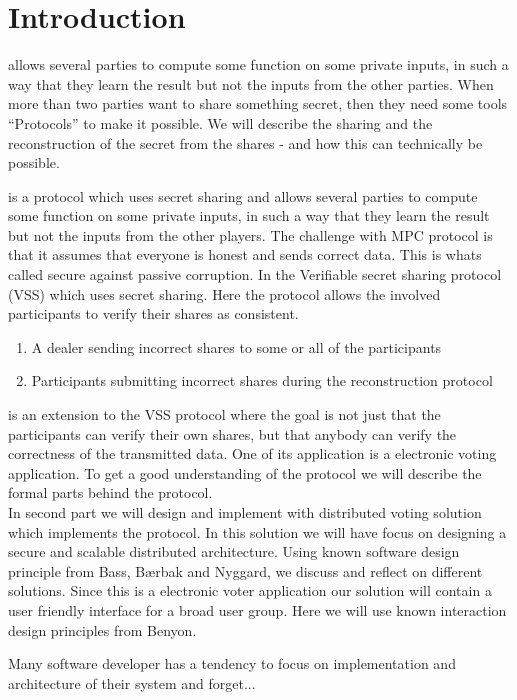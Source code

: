 \section{Introduction}

 allows several parties to compute some function on some private inputs, in such a way that they learn the result but not the inputs from the other parties. When more than two parties want to share something secret, then they need some tools “Protocols” to make it possible. We will describe the sharing and the reconstruction of the secret from the shares - and how this can technically be possible. 

 is a protocol which uses secret sharing and allows several parties to compute some function on some private inputs, in such a way that they learn the result but not the inputs from the other players.  The challenge with MPC protocol is that it assumes that everyone is honest and sends correct data. This is whats called secure against passive corruption. In the Verifiable secret sharing protocol (VSS) which uses secret sharing. Here the protocol allows the involved participants to verify their shares as consistent.   \\


\begin{infobox}
\begin{enumerate}
\item A dealer sending incorrect shares to some or all of the participants
\item Participants submitting incorrect shares during the reconstruction protocol
\end{enumerate}
\end{infobox}

 is an extension to the VSS protocol where the goal is not just that the participants can verify their own shares, but that anybody can verify the correctness of the transmitted data. One of its application is a electronic voting application. To get a good understanding of the protocol we will describe the formal parts behind the protocol. \\

 In second part we will design and implement with distributed voting solution which implements the protocol. In this solution we will have focus on designing a secure and scalable distributed architecture. Using known software design principle from Bass, Bærbak and Nyggard, we discuss and reflect on different solutions. Since this is a electronic voter application our solution will contain a user friendly interface for a broad user group. Here we will use known interaction design principles from Benyon.


Many software developer has a tendency to focus on implementation and architecture of their system and forget...

